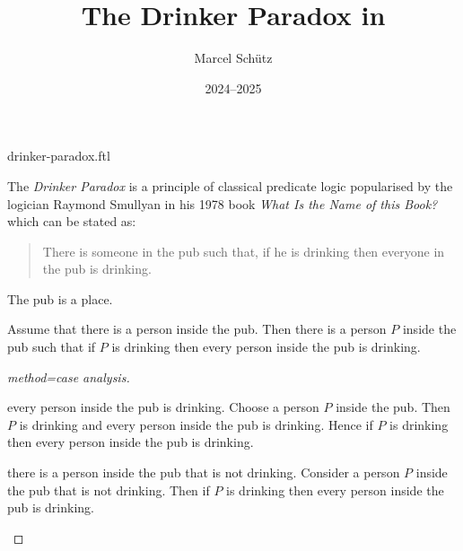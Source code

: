 \documentclass{stex}
\title{The Drinker Paradox in \Naproche}
\author{Marcel Schütz}
\date{2024--2025}
\begin{document}
\begin{smodule}{drinker-paradox.ftl}
\maketitle


\noindent The \emph{Drinker Paradox} is a principle of classical predicate 
logic popularised by the logician Raymond Smullyan in his 1978 book
\textit{What Is the Name of this Book?} \cite{Smullyan1978} which can be 
stated as:

\begin{quotation}
  \noindent There is someone in the pub such that, if he is drinking then 
  everyone in the pub is drinking.
\end{quotation}

\begin{forthel}

  \begin{signature*}
    The pub is a place.
  \end{signature*}
  
  \begin{theorem*}[title=Drinker Paradox,id=drinker_paradox]
    Assume that there is a person inside the pub.
    Then there is a person $P$ inside the pub such that if $P$ is drinking then every person inside the pub is drinking.
  \end{theorem*}
  \begin{proof}[method=case analysis]
    \begin{case}{every person inside the pub is drinking.}
      Choose a person $P$ inside the pub.
      Then $P$ is drinking and every person inside the pub is drinking.
      Hence if $P$ is drinking then every person inside the pub is drinking.
    \end{case}
  
    \begin{case}{there is a person inside the pub that is not drinking.}
      Consider a person $P$ inside the pub that is not drinking.
      Then if $P$ is drinking then every person inside the pub is drinking.
    \end{case}
  \end{proof}
\end{forthel}

\printbibliography
{}
\end{smodule}
\end{document}
